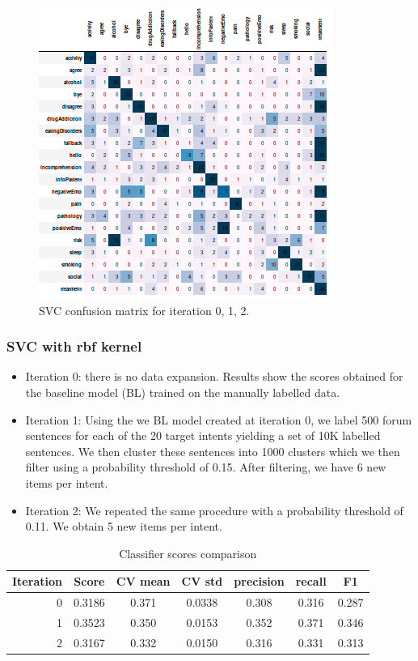 \documentclass[11pt]{article}
\begin{document}
\begin{figure}[h]
	\includegraphics[scale=0.3]{lsvc_2.png}
	\caption{SVC confusion matrix for iteration 0, 1, 2.}
\label{lsvc_cm}
\end{figure}
\FloatBarrier




\subsubsection{SVC with rbf kernel}
\label{subsec:semisupervised-rbf}


\begin{itemize}
\item Iteration 0: there is no data expansion. Results show the scores
  obtained for the baseline model (BL) trained on the manually labelled
  data.
\item Iteration 1: Using the we BL model created at iteration 0, we
  label 500 forum sentences for each of the 20 target intents
  yielding a set of 10K labelled sentences. We then cluster these
  sentences into 1000 clusters which we then filter using a probability
  threshold of 0.15. After filtering, we have 6 new items per intent.
\item Iteration 2: We repeated the same procedure with a probability
  threshold of 0.11. We obtain 5 new items per intent.
\end{itemize}

\begin{table}[htb]
\begin{center}
\begin{tabular}{ |r|c|c|c|c|c|c| }
\hline
Iteration 	& Score  & CV mean & CV std & precision & recall & F1 \\ \hline
0			& 0.3186 & 0.371   & 0.0338 & 0.308 	& 0.316  & 0.287 \\ \hline
1			& 0.3523 & 0.350   & 0.0153 & 0.352 	& 0.371  & 0.346 \\ \hline
2 			& 0.3167 & 0.332   & 0.0150 & 0.316 	& 0.331  & 0.313 \\ \hline
\end{tabular}
\caption{Classifier scores comparison}
\label{tab:rbf_gen_scores}
\end{center}
\end{table}
\FloatBarrier
\end{document}
